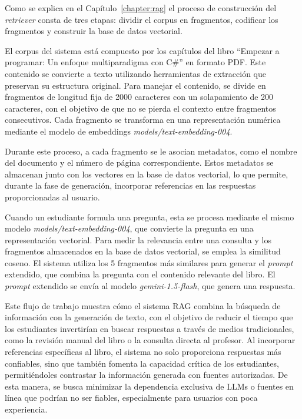 Como se explica en el Capítulo~\ref{chapter:rag} el proceso de construcción del \textit{retriever} consta de tres etapas: dividir el corpus en fragmentos, codificar los fragmentos y construir la base de datos vectorial.

El corpus del sistema está compuesto por los capítulos del libro ``Empezar a programar: Un enfoque multiparadigma con C\#'' en formato PDF. Este contenido se convierte a texto utilizando herramientas de extracción que preservan su estructura original. Para manejar el contenido, se divide en fragmentos de longitud fija de 2000 caracteres con un solapamiento de 200 caracteres, con el objetivo de que no se pierda el contexto entre fragmentos consecutivos. Cada fragmento se transforma en una representación numérica mediante el modelo de embeddings \textit{models/text-embedding-004}.

Durante este proceso, a cada fragmento se le asocian metadatos, como el nombre del documento y el número de página correspondiente. Estos metadatos se almacenan junto con los vectores en la base de datos vectorial, lo que permite, durante la fase de generación, incorporar referencias en las respuestas proporcionadas al usuario.

Cuando un estudiante formula una pregunta, esta se procesa mediante el mismo modelo \textit{models/text-embedding-004}, que convierte la pregunta en una representación vectorial. Para medir la relevancia entre una consulta y los fragmentos almacenados en la base de datos vectorial, se emplea la similitud coseno. El sistema utiliza los 5 fragmentos más similares para generar el \textit{prompt} extendido, que combina la pregunta con el contenido relevante del libro. El \textit{prompt} extendido se envía al modelo \textit{gemini-1.5-flash}, que genera una respuesta.

Este flujo de trabajo muestra cómo el sistema RAG combina la búsqueda de información con la generación de texto, con el objetivo de reducir el tiempo que los estudiantes invertirían en buscar respuestas a través de medios tradicionales, como la revisión manual del libro o la consulta directa al profesor. Al incorporar referencias específicas al libro, el sistema no solo proporciona respuestas más confiables, sino que también fomenta la capacidad crítica de los estudiantes, permitiéndoles contrastar la información generada con fuentes autorizadas. De esta manera, se busca minimizar la dependencia exclusiva de LLMs o fuentes en línea que podrían no ser fiables, especialmente para usuarios con poca experiencia.

